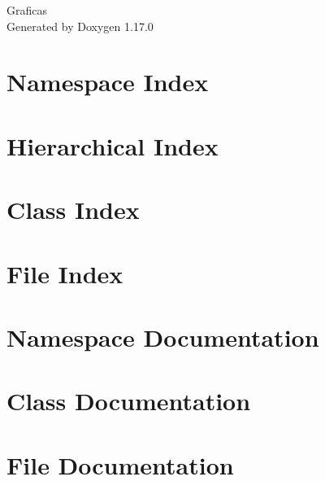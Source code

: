 \documentclass[twoside]{book}
\newcommand{\+}{\discretionary{\mbox{\scriptsize$\hookleftarrow$}}{}{}}
\newcommand{\clearemptydoublepage}{%
    \newpage{\pagestyle{empty}\cleardoublepage}%
  }
\begin{document}
  \raggedbottom
    \hypersetup{pageanchor=false,
                bookmarksnumbered=true,
                pdfencoding=unicode
               }
  \begin{titlepage}
  \vspace*{7cm}
  \begin{center}%
  {\Large Graficas}\\
  \vspace*{1cm}
  {\large Generated by Doxygen 1.17.0}\\
  \end{center}
  \end{titlepage}
  \clearemptydoublepage
  \tableofcontents
  \clearemptydoublepage
  \hypersetup{pageanchor=true}
\chapter{Namespace Index}

\chapter{Hierarchical Index}

\chapter{Class Index}

\chapter{File Index}

\chapter{Namespace Documentation}

\chapter{Class Documentation}






\chapter{File Documentation}






  \backmatter
  \newpage
  \clearemptydoublepage
  \printindex
\end{document}
